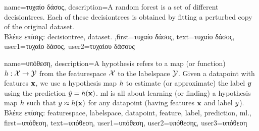 {name={\foreignlanguage{greek}{τυχαίο δάσος}},
	description={A random forest is a set of different \gls{decisiontree}s. 
		Each of these \gls{decisiontree}s is obtained by fitting a perturbed copy of 
		the original \gls{dataset}.\\
		\foreignlanguage{greek}{Βλέπε επίσης:} \gls{decisiontree}, \gls{dataset}.
		},first={\foreignlanguage{greek}{τυχαίο δάσος}}, 
		text={\foreignlanguage{greek}{τυχαίο δάσος}},
		user1={\foreignlanguage{greek}{τυχαίο δάσος}}, %
		user2={\foreignlanguage{greek}{τυχαίου δάσους}} %
}


{name={\foreignlanguage{greek}{υπόθεση}},
	description={A hypothesis refers to a map (or function) $h: \mathcal{X} \rightarrow \mathcal{Y}$ from the 
		\gls{featurespace} $\mathcal{X}$ to the \gls{labelspace} $\mathcal{Y}$. 
		Given a \gls{datapoint} with \gls{feature}s ${\bf x}$, we use a hypothesis map $h$
		to estimate (or approximate) the \gls{label} $y$ using the \gls{prediction}  
		$\hat{y} = h({\bf x})$. \Gls{ml} is all about learning (or finding) a 
		hypothesis map $h$ such that $y \approx h({\bf x})$ 
		for any \gls{datapoint} (having \gls{feature}s ${\bf x}$ and \gls{label} $y$).\\
		\foreignlanguage{greek}{Βλέπε επίσης:} \gls{featurespace}, \gls{labelspace}, \gls{datapoint}, \gls{feature}, \gls{label}, \gls{prediction}, \gls{ml}.},
		first={\foreignlanguage{greek}{υπόθεση}},
		text={\foreignlanguage{greek}{υπόθεση}},
		user1={\foreignlanguage{greek}{υπόθεση}}, %
		user2={\foreignlanguage{greek}{υπόθεσης}}, %
		user3={\foreignlanguage{greek}{υπόθεση}} %
}

